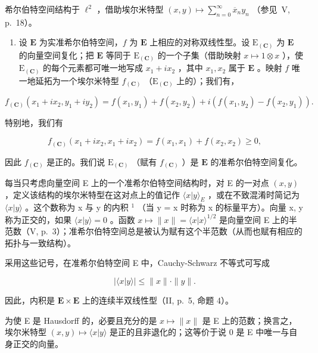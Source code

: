 希尔伯特空间结构于 \(\ell^2\) ，借助埃尔米特型 \((x, y) \mapsto \sum_{n=0}^{\infty} \overline{x}_n y_n\) （参见~V, p.~18）。

\begin{enumerate}
\def\labelenumi{\arabic{enumi})}
\setcounter{enumi}{4}
\tightlist
\item
  设 \(\mathbf{E}\) 为实准希尔伯特空间，\(f\) 为 \(\mathbf{E}\) 上相应的对称双线性型。设 \(\mathrm{E}_{(\mathbf{C})}\) 为 \(\mathbf{E}\) 的向量空间复化；把 \(\mathbf{E}\) 等同于 \(\mathrm{E}_{(\mathbf{C})}\) 的一个子集（借助映射 \(x \mapsto 1 \otimes x\) ），使 \(\mathrm{E}_{(\mathbf{C})}\) 的每个元素都可唯一地写成 \(x_1 + ix_2\) ，其中 \(x_1, x_2\) 属于 \(\mathbf{E}\) 。映射 \(f\) 唯一地延拓为一个埃尔米特型 \(f_{(\mathbf{C})}\) （\(\mathrm{E}_{(\mathbf{C})}\) 上的）；我们有，
\end{enumerate}

\[
f _ {(\mathbf {C})} \left(x _ {1} + i x _ {2}, y _ {1} + i y _ {2}\right) = f \left(x _ {1}, y _ {1}\right) + f \left(x _ {2}, y _ {2}\right) + i \left(f \left(x _ {1}, y _ {2}\right) - f \left(x _ {2}, y _ {1}\right)\right).
\]

特别地，我们有

\[
f _ {(\mathbf {C})} (x _ {1} + i x _ {2}, x _ {1} + i x _ {2}) = f (x _ {1}, x _ {1}) + f (x _ {2}, x _ {2}) \geqslant 0,
\]

因此 \(f_{(\mathbf{C})}\) 是正的。我们说 \(\mathrm{E}_{(\mathbf{C})}\) （赋有 \(f_{(\mathbf{C})}\) ）是 \(\mathbf{E}\) 的准希尔伯特空间复化。

每当只考虑向量空间 E 上的一个准希尔伯特空间结构时，对 E 的一对点 \((x, y)\) ，定义该结构的埃尔米特型在这对点上的值记作 \(\langle x|y\rangle_{E}\) ，或在不致混淆时简记为 \(\langle x|y\rangle\) 。这个数称为 x 与 y 的内积 \(^{1}\) （当 y = x 时称为 x 的标量平方）。向量 x, y 称为正交的，如果 \(\langle x|y\rangle = 0\) 。函数 \(x \mapsto \|x\| = \langle x|x\rangle^{1/2}\) 是向量空间 E 上的半范数（V, p.~3）；准希尔伯特空间总是被认为赋有这个半范数（从而也赋有相应的拓扑与一致结构）。

采用这些记号，在准希尔伯特空间 E 中，Cauchy-Schwarz 不等式可写成

\[
\left| \langle x | y \rangle \right| \leqslant \| x \|\cdot \| y \|.\tag{9}
\]

因此，内积是 \(\mathbf{E} \times \mathbf{E}\) 上的连续半双线性型（II, p.~5, 命题 4）。

为使 E 是 Hausdorff 的，必要且充分的是 \(x \mapsto \|x\|\) 是 E 上的范数；换言之，埃尔米特型 \((x, y) \mapsto \langle x | y \rangle\) 是正的且非退化的；这等价于说 0 是 E 中唯一与自身正交的向量。

